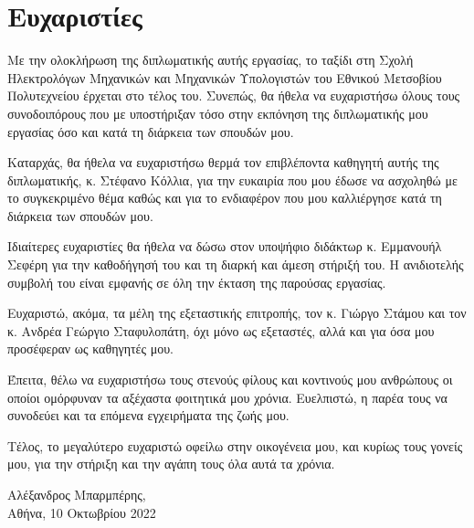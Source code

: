 \chapter*{Ευχαριστίες}

Με την ολοκλήρωση της διπλωματικής αυτής εργασίας, το ταξίδι στη Σχολή Ηλεκτρολόγων Μηχανικών και Μηχανικών Υπολογιστών του Εθνικού Μετσοβίου Πολυτεχνείου έρχεται στο τέλος του. Συνεπώς, θα ήθελα να ευχαριστήσω όλους τους συνοδοιπόρους που με υποστήριξαν τόσο στην εκπόνηση της διπλωματικής μου εργασίας όσο και κατά τη διάρκεια των σπουδών μου.\par

Καταρχάς, θα ήθελα να ευχαριστήσω θερμά τον επιβλέποντα καθηγητή αυτής της διπλωματικής, κ. Στέφανο Κόλλια, για την ευκαιρία που μου έδωσε να ασχοληθώ με το συγκεκριμένο θέμα καθώς και για το ενδιαφέρον που μου καλλιέργησε κατά τη διάρκεια των σπουδών μου.\par

Ιδιαίτερες ευχαριστίες θα ήθελα να δώσω στον υποψήφιο διδάκτωρ κ. Εμμανουήλ Σεφέρη για την καθοδήγησή του και τη διαρκή και άμεση στήριξή του. Η ανιδιοτελής συμβολή του είναι εμφανής σε όλη την έκταση της παρούσας εργασίας.\par

Ευχαριστώ, ακόμα, τα μέλη της εξεταστικής επιτροπής, τον κ. Γιώργο Στάμου και τον
κ. Ανδρέα Γεώργιο Σταφυλοπάτη, όχι μόνο ως εξεταστές, αλλά και για όσα μου προσέφεραν ως καθηγητές
μου.\par

Έπειτα, θέλω να ευχαριστήσω τους στενούς φίλους και κοντινούς μου ανθρώπους οι οποίοι ομόρφυναν τα αξέχαστα φοιτητικά μου χρόνια. Ευελπιστώ, η παρέα τους να συνοδεύει και τα επόμενα εγχειρήματα της ζωής μου.\par

Τέλος, το μεγαλύτερο ευχαριστώ οφείλω στην οικογένεια μου, και κυρίως τους γονείς μου, για την στήριξη και την αγάπη τους όλα αυτά τα χρόνια.\par
\begin{flushright}
    Αλέξανδρος Μπαρμπέρης,\\
    Αθήνα, 10 Οκτωβρίου 2022
\end{flushright}